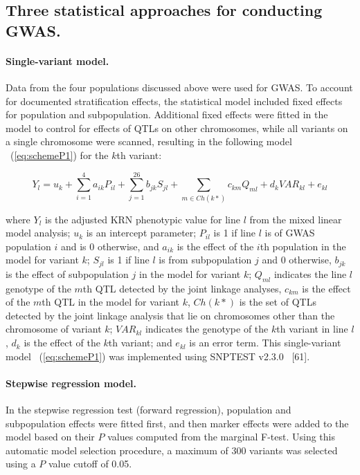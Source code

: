 \documentclass[10pt,letterpaper]{article}
\begin{document}
\subsection*{Three statistical approaches for conducting GWAS.}
\paragraph{Single-variant model.} 
Data from the four populations discussed above were used for GWAS. To account for documented stratification effects, the statistical model included fixed effects for population and subpopulation. Additional fixed effects were fitted in the model to control for effects of QTLs on other chromosomes, while all variants on a single chromosome were scanned, resulting in the following model ~(\ref{eq:schemeP1}) for the $k$th variant:  

\begin{equation}\label{eq:schemeP1} 
Y_l = u_k + \sum_{i=1}^{4}a_{ik}P_{il} + \sum_{j=1}^{26} b_{jk}S_{jl} + \sum_{m \in Ch(k*)}c_{km}Q_{ml} + d_kVAR_{kl} + e_{kl}
\end{equation}


where $Y_l$ is the adjusted KRN phenotypic value for line $l$ from the mixed linear model analysis; $u_k$ is an intercept parameter; $P_{il}$ is 1 if line $l$ is of GWAS population $i$ and is 0 otherwise, and $a_{ik}$ is the effect of the $i$th population in the model for variant $k$; $S_{jl}$ is 1 if line $l$ is from subpopulation $j$ and 0 otherwise, $b_{jk}$ is the effect of subpopulation $j$ in the model for variant $k$; $Q_{ml}$ indicates the line $l$ genotype of the $m$th QTL detected by the joint linkage analyses, $c_{km}$ is the effect of the $m$th QTL in the model for variant $k$, $Ch(k*)$ is the set of QTLs detected by the joint linkage analysis that lie on chromosomes other than the chromosome of variant $k$; $VAR_{kl}$ indicates the genotype of the $k$th variant in line $l$, $d_k$ is the effect of the $k$th variant; and $e_{kl}$ is an error term. This single-variant model ~(\ref{eq:schemeP1}) was implemented using SNPTEST v2.3.0 ~\cite{Marchini2010}[61].

\paragraph{Stepwise regression model.} 
In the stepwise regression test (forward regression), population and subpopulation effects were fitted first, and then marker effects were added to the model based on their $P$ values computed from the marginal F-test. Using this automatic model selection procedure, a maximum of 300 variants was selected using a $P$ value cutoff of 0.05.
\end{document}

